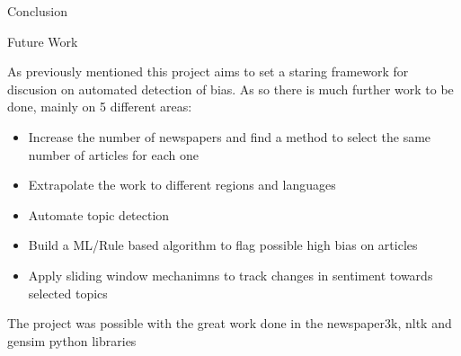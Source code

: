\documentclass[final,8pt]{beamer} %
\newlength{\twocolwid}
\begin{document}
\begin{frame}[t]
\begin{columns}[t]
\begin{column}{\twocolwid}
\begin{block}{Conclusion {}}
\end{block}


\begin{block}{Future Work {}}

    As previously mentioned this project aims to set a staring framework for discusion on automated detection of bias. 
    As so there is much further work to be done, mainly on 5 different areas:

    \begin{itemize}
        \item Increase the number of newspapers and find a method to select the same number of articles for each one
        \item Extrapolate the work to different regions and languages
        \item Automate topic detection 
        \item Build a ML/Rule based algorithm to flag possible high bias on articles
        \item Apply sliding window mechanimns to track changes in sentiment towards selected topics
    \end{itemize}

\end{block}



\begin{block}{ {}}

    The project was possible with the great work done in the newspaper3k, nltk and gensim python libraries

    \small{} \\
    
    \end{block}


\end{column} %

\end{columns} %

\end{frame} %
\end{document}
